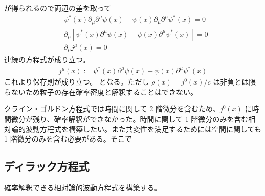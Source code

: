 \documentclass[uplatex,dvipdfmx,a4paper,11pt]{jlreq}
\theoremstyle{definition}
\numberwithin{equation}{section}
\begin{document}
が得られるので両辺の差を取って
\begin{align}
   & \psi^*(x)\partial_\mu\partial^\mu\psi(x) - \psi(x)\partial_\mu\partial^\mu\psi^*(x) = 0 \\
   & \partial_\mu[\psi^*(x)\partial^\mu\psi(x) - \psi(x)\partial^\mu\psi^*(x)] = 0           \\
   & \partial_\mu j^\mu(x) = 0
\end{align}
連続の方程式が成り立つ。
\begin{align}
  j^\mu(x) := \psi^*(x)\partial^\mu\psi(x) - \psi(x)\partial^\mu\psi^*(x)
\end{align}
これより保存則が成り立つ。
となる。ただし $\rho(x) = j^0(x)/c$ は非負とは限らないため粒子の存在確率密度と解釈することはできない。

クライン・ゴルドン方程式では時間に関して 2 階微分を含むため、$j^0(x)$ に時間微分が残り、確率解釈ができなかった。時間に関して 1 階微分のみを含む相対論的波動方程式を構築したい。また共変性を満足するためには空間に関しても 1 階微分のみを含む必要がある。そこで

\subsection{ディラック方程式}
確率解釈できる相対論的波動方程式を構築する。
\end{document}
